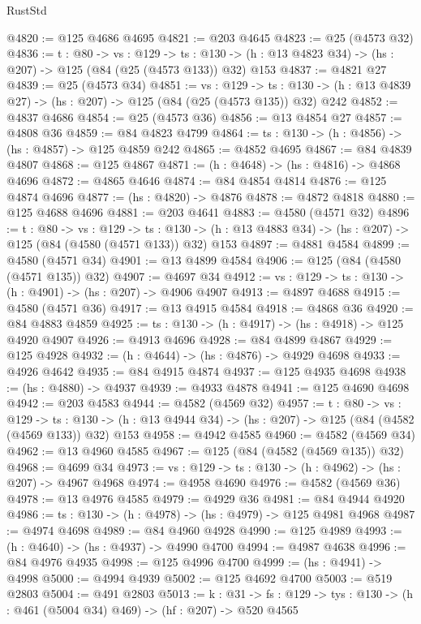 \begin{lexlean}{RustStd}
\begin{coremodule}
{\begin{coremodule}
{{{{{{{{{{{{{{{@4820 := @125 @4686 @4695
@4821 := @203 @4645
@4823 := @25 (@4573 @32)
@4836 := {t : @80} ->
  {vs : @129} ->
  {ts : @130} -> (h : @13 @4823 @34) -> (hs : @207) -> @125 (@84 (@25 (@4573 @133)) @32) @153
@4837 := @4821 @27
@4839 := @25 (@4573 @34)
@4851 := {vs : @129} ->
  {ts : @130} -> (h : @13 @4839 @27) -> (hs : @207) -> @125 (@84 (@25 (@4573 @135)) @32) @242
@4852 := @4837 @4686
@4854 := @25 (@4573 @36)
@4856 := @13 @4854 @27
@4857 := @4808 @36
@4859 := @84 @4823 @4799
@4864 := {ts : @130} -> (h : @4856) -> (hs : @4857) -> @125 @4859 @242
@4865 := @4852 @4695
@4867 := @84 @4839 @4807
@4868 := @125 @4867
@4871 := (h : @4648) -> (hs : @4816) -> @4868 @4696
@4872 := @4865 @4646
@4874 := @84 @4854 @4814
@4876 := @125 @4874 @4696
@4877 := (hs : @4820) -> @4876
@4878 := @4872 @4818
@4880 := @125 @4688 @4696
@4881 := @203 @4641
@4883 := @4580 (@4571 @32)
@4896 := {t : @80} ->
  {vs : @129} ->
  {ts : @130} -> (h : @13 @4883 @34) -> (hs : @207) -> @125 (@84 (@4580 (@4571 @133)) @32) @153
@4897 := @4881 @4584
@4899 := @4580 (@4571 @34)
@4901 := @13 @4899 @4584
@4906 := @125 (@84 (@4580 (@4571 @135)) @32)
@4907 := @4697 @34
@4912 := {vs : @129} -> {ts : @130} -> (h : @4901) -> (hs : @207) -> @4906 @4907
@4913 := @4897 @4688
@4915 := @4580 (@4571 @36)
@4917 := @13 @4915 @4584
@4918 := @4868 @36
@4920 := @84 @4883 @4859
@4925 := {ts : @130} -> (h : @4917) -> (hs : @4918) -> @125 @4920 @4907
@4926 := @4913 @4696
@4928 := @84 @4899 @4867
@4929 := @125 @4928
@4932 := (h : @4644) -> (hs : @4876) -> @4929 @4698
@4933 := @4926 @4642
@4935 := @84 @4915 @4874
@4937 := @125 @4935 @4698
@4938 := (hs : @4880) -> @4937
@4939 := @4933 @4878
@4941 := @125 @4690 @4698
@4942 := @203 @4583
@4944 := @4582 (@4569 @32)
@4957 := {t : @80} ->
  {vs : @129} ->
  {ts : @130} -> (h : @13 @4944 @34) -> (hs : @207) -> @125 (@84 (@4582 (@4569 @133)) @32) @153
@4958 := @4942 @4585
@4960 := @4582 (@4569 @34)
@4962 := @13 @4960 @4585
@4967 := @125 (@84 (@4582 (@4569 @135)) @32)
@4968 := @4699 @34
@4973 := {vs : @129} -> {ts : @130} -> (h : @4962) -> (hs : @207) -> @4967 @4968
@4974 := @4958 @4690
@4976 := @4582 (@4569 @36)
@4978 := @13 @4976 @4585
@4979 := @4929 @36
@4981 := @84 @4944 @4920
@4986 := {ts : @130} -> (h : @4978) -> (hs : @4979) -> @125 @4981 @4968
@4987 := @4974 @4698
@4989 := @84 @4960 @4928
@4990 := @125 @4989
@4993 := (h : @4640) -> (hs : @4937) -> @4990 @4700
@4994 := @4987 @4638
@4996 := @84 @4976 @4935
@4998 := @125 @4996 @4700
@4999 := (hs : @4941) -> @4998
@5000 := @4994 @4939
@5002 := @125 @4692 @4700
@5003 := @519 @2803
@5004 := @491 @2803
@5013 := {k : @31} ->
  {fs : @129} -> {tys : @130} -> (h : @461 (@5004 @34) @469) -> (hf : @207) -> @520 @4565
}}}}}}}}}}}}}}}
\end{coremodule}}
\end{coremodule}
\end{lexlean}
